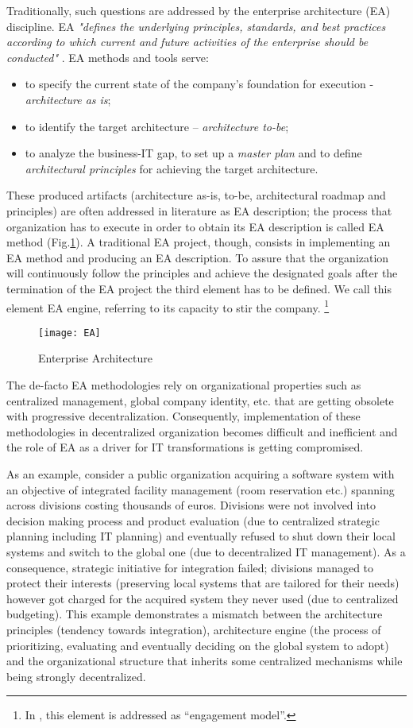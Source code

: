 Traditionally, such questions are addressed by the enterprise architecture (EA) discipline. 
EA \textit{"defines the underlying principles, standards, and best practices according to which current and future activities of the enterprise should be conducted"} \cite{jungle2004}. EA methods and tools serve:
\begin{itemize}
\item to specify the current state of the company's foundation for execution \cite{ross2006}  - \textit{architecture as is};
\item to identify the target architecture – \textit{architecture to-be};
\item to analyze the business-IT gap, to set up a \textit{master plan} and to define \textit{architectural principles} for achieving the target architecture.
\end{itemize}
These produced artifacts (architecture as-is, to-be, architectural roadmap and principles) are often addressed in literature as EA description; the process that organization has to execute in order to obtain its EA description is called EA method (Fig.\ref{fig:EA_general}). A traditional EA project, though, consists in implementing an EA method and producing an EA description. To assure that the organization will continuously follow the principles and achieve the designated goals after the termination of the EA project   the third element has to be defined.  We call this element EA engine, referring to its capacity to stir the company. \footnote{In \cite{ross2006}, this element is addressed as “engagement model”.}
\begin{figure}
\centering
\texttt{[image: EA]}
\caption{Enterprise Architecture}
\label{fig:EA_general}
\end{figure}
The de-facto EA methodologies rely on organizational properties such as centralized management, global company identity, etc.  that are getting obsolete with progressive decentralization.  Consequently, implementation of these methodologies in decentralized organization becomes difficult and inefficient and  the role of EA as a driver for IT transformations is getting compromised.

As an example, consider a public organization acquiring a software system with an objective of integrated facility management (room reservation etc.) spanning across divisions costing thousands of euros. Divisions were not involved into decision making process and product evaluation (due to centralized strategic planning including IT planning) and eventually refused to shut down their local systems and switch to the global one (due to decentralized IT management). As a consequence, strategic initiative for integration failed; divisions managed to protect their interests  (preserving local  systems  that  are  tailored for their needs) however got charged for the acquired system they never used (due to centralized budgeting). This example demonstrates a mismatch between the architecture principles (tendency towards integration), architecture engine (the process of prioritizing, evaluating and eventually deciding on the global system to adopt) and the organizational structure that inherits some centralized mechanisms while being strongly decentralized.

